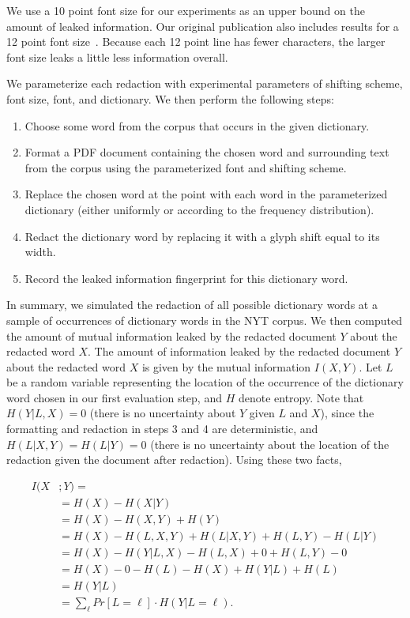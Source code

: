 We use a 10 point font size for our experiments as an upper bound on the amount of leaked information.
Our original publication also includes results for a 12 point font size~\cite{bland2023story}.
Because each 12 point line has fewer characters, the larger font size leaks a little less information overall.

\label{sec:mutinfmethod}
We parameterize each redaction with experimental parameters of shifting scheme, font size, font, and dictionary.
We then perform the following steps:

\begin{enumerate}[nosep]
\item Choose some word from the corpus that occurs in the given dictionary.
\item Format a PDF document containing the chosen word and surrounding text from the corpus using the parameterized font and shifting scheme.
\item Replace the chosen word at the point with each word in the parameterized dictionary (either uniformly or according to the frequency distribution).
\item Redact the dictionary word by replacing it with a glyph shift equal to its width.
\item Record the leaked information fingerprint for this dictionary word.
\end{enumerate}

In summary, we simulated the redaction of all possible dictionary words at a sample of occurrences of dictionary words in the NYT corpus.
We then computed the amount of mutual information leaked by the redacted document $Y$ about the redacted word $X$.
The amount of information leaked by the redacted document $Y$ about the redacted word $X$ is given by the mutual information $I(X,Y)$.
Let $L$ be a random variable representing the location of the occurrence of the dictionary word chosen in our first evaluation step, and $H$ denote entropy.
Note that $H(Y|L,X) = 0$ (there is no uncertainty about $Y$ given $L$ and $X$), since the formatting and redaction in steps 3 and 4 are deterministic, and $H(L|X,Y) = H(L|Y) = 0$ (there is no uncertainty about the location of the redaction given the document after redaction). 
Using these two facts,

\begingroup\small
\begin{align*}
I(X&;Y) = \\
&= H(X) - H(X|Y) \\
&= H(X) - H(X,Y) + H(Y) \\
&= H(X) - H(L,X,Y) + H(L|X,Y) + H(L,Y) - H(L|Y) \\
&= H(X) - H(Y|L,X) - H(L,X) + 0 + H(L,Y) - 0 \\
&= H(X) - 0 - H(L) - H(X) + H(Y|L) + H(L) \\
&= H(Y|L) \\
&= \sum_\ell Pr[L=\ell]\cdot H(Y|L=\ell).
\end{align*}
\endgroup

